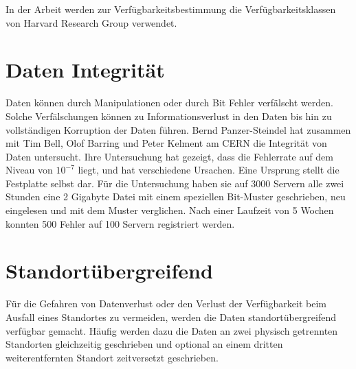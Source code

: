 In der Arbeit werden zur Verfügbarkeitsbestimmung die Verfügbarkeitsklassen von Harvard Research Group verwendet.

\section{Daten Integrität}
Daten können durch Manipulationen oder durch Bit Fehler verfälscht werden. Solche Verfälschungen können zu Informationsverlust in den Daten bis hin zu vollständigen Korruption der Daten führen. 
Bernd Panzer-Steindel hat zusammen mit Tim Bell, Olof Barring und Peter Kelment am CERN die Integrität von Daten untersucht. Ihre Untersuchung hat gezeigt, dass die Fehlerrate auf dem Niveau von $10^{-7}$ liegt, und hat verschiedene Ursachen. Eine Ursprung stellt die Festplatte selbst dar. Für die Untersuchung haben sie auf 3000 Servern alle zwei Stunden eine 2 Gigabyte Datei mit einem speziellen Bit-Muster geschrieben, neu eingelesen und mit dem Muster verglichen. Nach einer Laufzeit von 5 Wochen konnten 500 Fehler auf 100 Servern registriert werden. \cite{Panzer-steindel2007}

\section{Standortübergreifend}
Für die Gefahren von Datenverlust oder den Verlust der Verfügbarkeit beim Ausfall eines Standortes zu vermeiden, werden die Daten standortübergreifend verfügbar gemacht. Häufig werden dazu die Daten an zwei physisch getrennten Standorten gleichzeitig geschrieben und optional an einem dritten weiterentfernten Standort zeitversetzt geschrieben. 